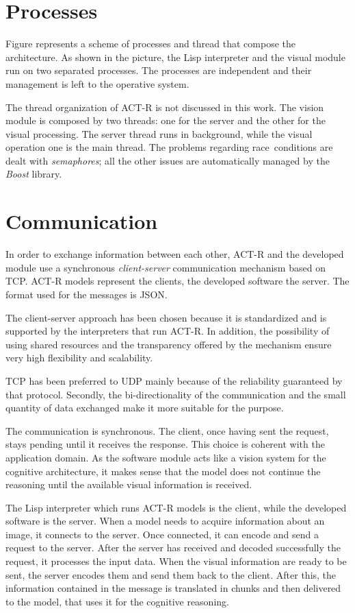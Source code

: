 	\section{Processes}
	Figure \todo{} represents a scheme of processes and thread that compose the architecture.
	As shown in the picture, the \mbox{Lisp} interpreter and the visual module run on two separated processes. 
	The processes are independent and their management is left to the operative system.


	The thread organization of \mbox{ACT-R} is not discussed in this work.
	The vision module is composed by two threads: one for the server and the other for the visual processing. 
	The server thread runs in background, while the visual operation one is the main thread.
	The problems regarding \mbox{race conditions} are dealt with \emph{semaphores}; all the other issues are automatically managed by the \emph{Boost} library.


	\section{Communication}
	In order to exchange information between each other, \mbox{ACT-R} and the developed module use a synchronous \emph{client-server} communication mechanism based on \mbox{TCP}. 
	\mbox{ACT-R} models represent the clients, the developed software the server. 
	The format used for the messages is \mbox{JSON}.  		

	The client-server approach has been chosen because it is standardized and is supported by the interpreters that run \mbox{ACT-R}. 
	In addition, the possibility of using shared resources and the transparency offered by the mechanism ensure very high flexibility and scalability.

	TCP has been preferred to \mbox{UDP} mainly because of the reliability guaranteed by that protocol. 
	Secondly, the bi-directionality of the communication and the small quantity of data exchanged make it more suitable for the purpose.

	The communication is synchronous. 
	The client, once having sent the request, stays pending until it receives the response. 
	This choice is coherent with the application domain. 
	As the software module acts like a vision system for the cognitive architecture, it makes sense that the model does not continue the reasoning until the available visual information is received.

	The \mbox{Lisp} interpreter which runs \mbox{ACT-R} models is the client, while the developed software is the server.  	
	When a model needs to acquire information about an image, it connects to the server. 
	Once connected, it can encode and send a request to the server. 
	After the server has received and decoded successfully the request, it processes the input data. When the visual information are ready to be sent, the server encodes them and send them back to the client. 
	After this, the information contained in the message is translated in chunks and then delivered to the model, that uses it for the cognitive reasoning.

